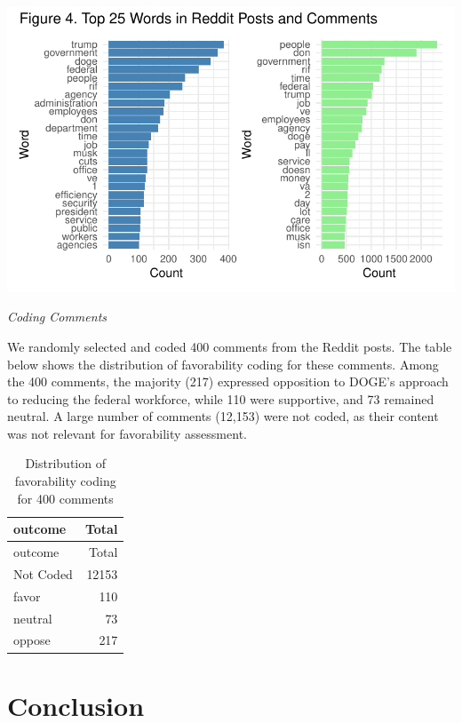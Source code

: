 \documentclass[
  12pt]{article}
\begin{document}
\includegraphics{paper_files/figure-pdf/unnamed-chunk-6-1.pdf}

\emph{Coding Comments}

We randomly selected and coded 400 comments from the Reddit posts. The
table below shows the distribution of favorability coding for these
comments. Among the 400 comments, the majority (217) expressed
opposition to DOGE's approach to reducing the federal workforce, while
110 were supportive, and 73 remained neutral. A large number of comments
(12,153) were not coded, as their content was not relevant for
favorability assessment.

\begin{longtable}[]{@{}lr@{}}
\caption{Distribution of favorability coding for 400
comments}\tabularnewline
\toprule\noalign{}
outcome & Total \\
\midrule\noalign{}
\endfirsthead
\toprule\noalign{}
outcome & Total \\
\midrule\noalign{}
\endhead
\bottomrule\noalign{}
\endlastfoot
Not Coded & 12153 \\
favor & 110 \\
neutral & 73 \\
oppose & 217 \\
\end{longtable}

\section{Conclusion}\label{conclusion}
\end{document}
